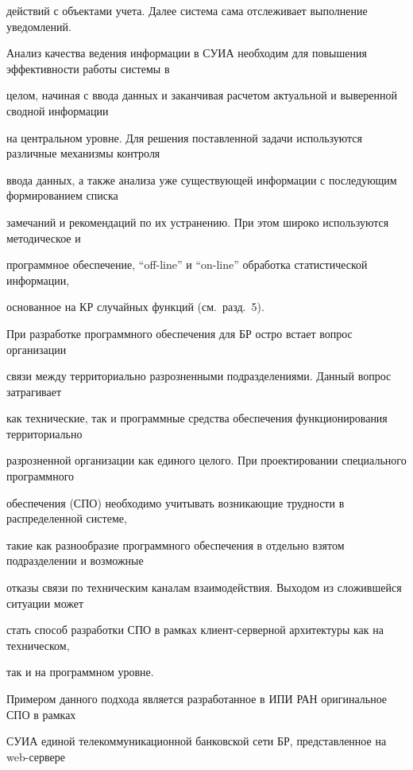 действий с объектами учета. Далее система сама отслеживает выполнение уведомлений.





Анализ качества ведения информации в СУИА необходим для повышения эффективности работы системы в 


целом, начиная с ввода данных и заканчивая расчетом актуальной и выверенной сводной информации 


на центральном уровне. Для решения поставленной задачи используются различные механизмы контроля 


ввода данных, а также анализа уже существующей информации с последующим формированием списка 


замечаний и рекомендаций по их устранению. При этом широко используются методическое и 


программное обеспечение, ``off-line'' и ``on-line'' обработка статистической информации, 


основанное на КР случайных функций (см.\ разд.~5).





При разработке программного обеспечения для БР остро встает вопрос организации 


связи между территориально разрозненными подразделениями. Данный вопрос затрагивает 


как технические, так и программные средства обеспечения функционирования территориально 


разрозненной организации как единого целого. При проектировании специального программного 


обеспечения (СПО) необходимо учитывать возникающие трудности в распределенной системе, 


такие как разнообразие программного обеспечения в отдельно взятом подразделении и возможные 


отказы связи по техническим каналам взаимодействия. Выходом из сложившейся ситуации может 


стать способ разработки СПО в рамках кли\-ент-сер\-вер\-ной архитектуры как на техническом, 


так и на программном уровне.





Примером данного подхода является разработанное в ИПИ РАН оригинальное СПО в рамках 


СУИА единой телекоммуникационной банковской сети БР, представленное на web-сер\-ве\-ре 


